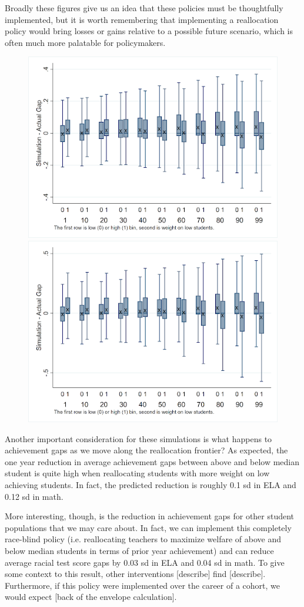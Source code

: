 \documentclass{article}
\theoremstyle{definition}
\theoremstyle{definition}
\theoremstyle{definition}
\theoremstyle{definition}
\begin{document}
	Broadly these figures give us an idea that these policies must be thoughtfully implemented, but it is worth remembering that implementing a reallocation policy would bring losses or gains relative to a possible future scenario, which is often much more palatable for policymakers.

 \begin{figure}[H]
    \centering
    \includegraphics[width=.45\textwidth]{Working_Paper/WP_Figures/ela_winners_losers.png}
    \includegraphics[width=.45\textwidth]{Working_Paper/WP_Figures/Math_winners_losers.png}
\end{figure}

Another important consideration for these simulations is what happens to achievement gaps as we move along the reallocation frontier? As expected, the one year reduction in average achievement gaps between above and below median student is quite high when reallocating students with more weight on low achieving students. In fact, the predicted reduction is roughly 0.1 sd in ELA and 0.12 sd in math.

	More interesting, though, is the reduction in achievement gaps for other student populations that we may care about. In fact, we can implement this completely race-blind policy (i.e. reallocating teachers to maximize welfare of above and below median students in terms of prior year achievement) and can reduce average racial test score gaps by 0.03 sd in ELA and 0.04 sd in math. To give some context to this result, other interventions [describe] find [describe]. Furthermore, if this policy were implemented over the career of a cohort, we would expect [back of the envelope calculation].
\end{document}
